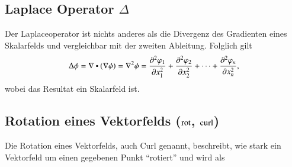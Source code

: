 \subsection[Laplace Operator Delta]{Laplace Operator $\Delta$}
Der Laplaceoperator ist nichts anderes als die Divergenz des Gradienten eines Skalarfelds und vergleichbar mit der zweiten Ableitung.
Folglich gilt
\[
    \Delta \phi = \nabla \dotp (\nabla \phi) = \nabla^2 \phi = \frac{\partial^2 \varphi_1}{\partial x_1^2} + \frac{\partial^2 \varphi_2}{\partial x_2^2} + \dots + \frac{\partial^2 \varphi_n}{\partial x_n^2},
\]
wobei das Resultat ein Skalarfeld ist.

\subsection[Rotation eines Vektorfelds (rot, curl)]{Rotation eines Vektorfelds ($\operatorname{rot}$, $\operatorname{curl}$)}
Die Rotation eines Vektorfelds, auch Curl genannt, beschreibt, wie stark ein Vektorfeld um einen gegebenen Punkt ``rotiert'' und wird als

